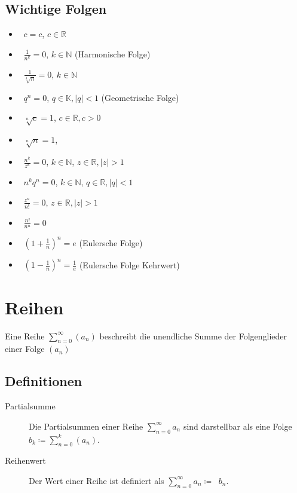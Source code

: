 \documentclass[a4paper, 11pt, accentcolor = tud3b]{tudreport}
\DeclareMathOperator{\liminfty}{\lim _ { n \rightarrow \infty }}
\begin{document}
        \section{Wichtige Folgen}
            \begin{itemize}
                \item $ \liminfty c = c $, $ c \in \mathbb{R} $
                \item $ \liminfty \frac{1}{n ^ k} = 0 $, $ k \in \mathbb{N} $ (Harmonische Folge)
                \item $ \liminfty \frac{1}{\sqrt[k]{n}} = 0 $, $ k \in \mathbb{N} $
                \item $ \liminfty q ^ n = 0 $, $ q \in \mathbb{K}, \lvert q \rvert < 1 $ (Geometrische Folge)
                \item $ \liminfty \sqrt[n]{c} = 1 $, $ c \in \mathbb{R}, c > 0 $
                \item $ \liminfty \sqrt[n]{n} = 1 $,
                \item $ \liminfty \frac{n ^ k}{z ^ k} = 0 $, $ k \in \mathbb{N} $, $ z \in \mathbb{R}, \lvert z \rvert > 1 $
                \item $ \liminfty n ^ k q ^ n = 0 $, $ k \in \mathbb{N} $, $ q \in \mathbb{R}, \lvert q \rvert < 1 $
                \item $ \liminfty \frac{z ^ n}{n!} = 0 $, $ z \in \mathbb{R}, \lvert z \rvert > 1 $
                \item $ \liminfty \frac{n!}{n ^ n} = 0 $
                \item $ \liminfty (1 + \frac{1}{n}) ^ n = e $ (Eulersche Folge)
		\item $ \liminfty (1 - \frac{1}{n}) ^ n = \frac{1}{e} $ (Eulersche Folge Kehrwert)
            \end{itemize}

    \chapter{Reihen}
        Eine Reihe $ \sum _ { n = 0 } ^ \infty (a _ n) $ beschreibt die unendliche Summe der Folgenglieder einer Folge $ (a _ n) $

        \section{Definitionen}
            \begin{description}
                \item[Partialsumme] Die Partialsummen einer Reihe $ \sum _ { n = 0 } ^ \infty a _ n $ sind darstellbar als eine Folge $ b _ k \coloneqq \sum _ { n = 0 } ^ k (a _ n) $.
                \item[Reihenwert] Der Wert einer Reihe ist definiert als $ \sum _ { n = 0 } ^ \infty a _ n \coloneqq \liminfty b _ n $.
            \end{description}
\end{document}
